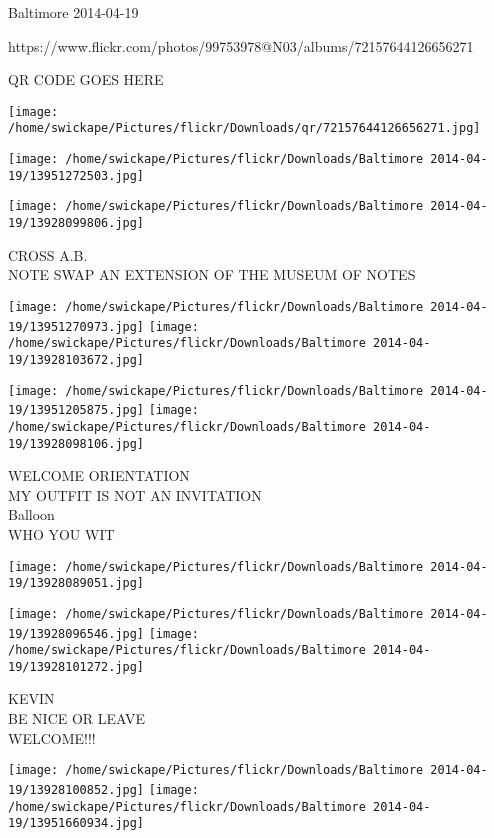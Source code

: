 \documentclass[10pt,letterpaper]{article}
\begin{document}
Baltimore 2014-04-19

https://www.flickr.com/photos/99753978@N03/albums/72157644126656271

QR CODE GOES HERE

\texttt{[image: /home/swickape/Pictures/flickr/Downloads/qr/72157644126656271.jpg]}
\pagebreak

\texttt{[image: /home/swickape/Pictures/flickr/Downloads/Baltimore 2014-04-19/13951272503.jpg]}

\vspace{0.25in}
\texttt{[image: /home/swickape/Pictures/flickr/Downloads/Baltimore 2014-04-19/13928099806.jpg]}

CROSS A.B.\\
NOTE SWAP AN EXTENSION OF THE MUSEUM OF NOTES\\
\pagebreak

\texttt{[image: /home/swickape/Pictures/flickr/Downloads/Baltimore 2014-04-19/13951270973.jpg]}
\texttt{[image: /home/swickape/Pictures/flickr/Downloads/Baltimore 2014-04-19/13928103672.jpg]}

\texttt{[image: /home/swickape/Pictures/flickr/Downloads/Baltimore 2014-04-19/13951205875.jpg]}
\texttt{[image: /home/swickape/Pictures/flickr/Downloads/Baltimore 2014-04-19/13928098106.jpg]}

WELCOME ORIENTATION\\
MY OUTFIT IS NOT AN INVITATION\\
Balloon\\
WHO YOU WIT\\
\pagebreak

\texttt{[image: /home/swickape/Pictures/flickr/Downloads/Baltimore 2014-04-19/13928089051.jpg]}

\vspace{0.25in}
\texttt{[image: /home/swickape/Pictures/flickr/Downloads/Baltimore 2014-04-19/13928096546.jpg]}
\texttt{[image: /home/swickape/Pictures/flickr/Downloads/Baltimore 2014-04-19/13928101272.jpg]}

KEVIN\\
BE NICE OR LEAVE\\
WELCOME!!!\\
\pagebreak

\texttt{[image: /home/swickape/Pictures/flickr/Downloads/Baltimore 2014-04-19/13928100852.jpg]}
\texttt{[image: /home/swickape/Pictures/flickr/Downloads/Baltimore 2014-04-19/13951660934.jpg]}
\end{document}
